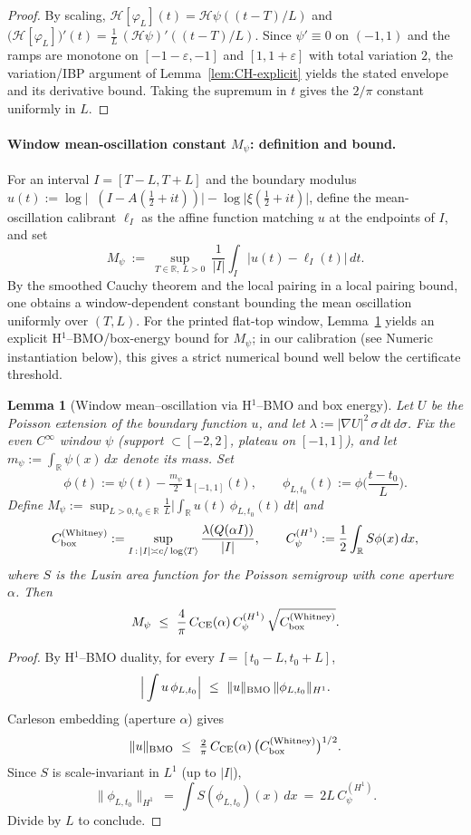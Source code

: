 \documentclass[11pt]{article}
\newtheorem{lemma}[theorem]{Lemma}
\theoremstyle{definition}
\theoremstyle{remark}
\theoremstyle{definition}
\newcommand{\R}{\mathbb{R}}
\DeclareMathOperator{\dettwo}{det_2}
\begin{document}
\begin{proof}
By scaling, \(\mathcal H[\varphi_L](t)=\mathcal H\psi((t-T)/L)\) and \(\big(\mathcal H[\varphi_L]\big)'(t)=\tfrac{1}{L}\,(\mathcal H\psi)'((t-T)/L)\). Since \(\psi'\equiv 0\) on \((-1,1)\) and the ramps are monotone on \([-1-\varepsilon,-1]\) and \([1,1+\varepsilon]\) with total variation \(2\), the variation/IBP argument of Lemma~\ref{lem:CH-explicit} yields the stated envelope and its derivative bound. Taking the supremum in \(t\) gives the \(2/\pi\) constant uniformly in \(L\).
\end{proof}
\paragraph{Window mean-oscillation constant \(M_\psi\): definition and bound.}
For an interval \(I=[T{-}L,T{+}L]\) and the boundary modulus \(u(t):=\log\big|\dettwo(I{-}A(\tfrac12{+}it))\big|{-}\log\big|\xi(\tfrac12{+}it)\big|\), define the mean-oscillation calibrant \(\ell_I\) as the affine function matching \(u\) at the endpoints of \(I\), and set
\[
  M_\psi\ :=\ \sup_{T\in\R,\ L>0}\ \frac{1}{|I|}\int_I \big|u(t)-\ell_I(t)\big|\,dt.
\]
By the smoothed Cauchy theorem and the local pairing in a local pairing bound, one obtains a window-dependent constant bounding the mean oscillation uniformly over $(T,L)$. For the printed flat-top window, Lemma~\ref{lem:Mpsi-correct} yields an explicit H$^1$--BMO/box-energy bound for $M_\psi$; in our calibration (see Numeric instantiation below), this gives a strict numerical bound well below the certificate threshold.
\begin{lemma}[Window mean--oscillation via H$^1$--BMO and box energy]\label{lem:Mpsi-correct}
Let $U$ be the Poisson extension of the boundary function $u$, and let $\lambda := |\nabla U|^2\,\sigma\,dt\,d\sigma$.
Fix the even $C^\infty$ window $\psi$ (support $\subset[-2,2]$, plateau on $[-1,1]$), and let $m_\psi:=\int_{\R}\psi(x)\,dx$ denote its mass. Set
\[
\phi(t):=\psi(t)-\tfrac{m_\psi}{2}\,\mathbf 1_{[-1,1]}(t),\qquad 
\phi_{L,t_0}(t):=\phi\!\Big(\frac{t-t_0}{L}\Big).
\]
Define $M_\psi:=\sup_{L>0,t_0\in\R}\frac1L\big|\int_\R u(t)\,\phi_{L,t_0}(t)\,dt\big|$ and
\[
 C_{\rm box}^{(\mathrm{Whitney})}:=\sup_{I\,:\,|I|\asymp c/\log\langle T\rangle}\frac{\lambda(Q(\alpha I))}{|I|},\qquad
C_\psi^{(H^1)}:=\frac12\int_{\R} S\phi(x)\,dx,
\]
where $S$ is the Lusin area function for the Poisson semigroup with cone aperture $\alpha$.
Then
\[
M_\psi\ \le\ \frac{4}{\pi}\,C_{\mathrm{CE}}(\alpha)\,C_\psi^{(H^1)}\,\sqrt{C_{\rm box}^{(\mathrm{Whitney})}}.
\]
\end{lemma}
\begin{proof}
By H$^1$--BMO duality, for every $I=[t_0-L,t_0+L]$,
\[ \Big|\int u\,\phi_{L,t_0}\Big|\ \le\ \|u\|_{\rm BMO}\,\|\phi_{L,t_0}\|_{H^1}. \]
Carleson embedding (aperture $\alpha$) gives
\[ \|u\|_{\rm BMO}\ \le\ \tfrac{2}{\pi}\,C_{\mathrm{CE}}(\alpha)\,\big(C_{\rm box}^{(\mathrm{Whitney})}\big)^{1/2}. \]
Since $S$ is scale-invariant in $L^1$ (up to $|I|$),
\[ \|\phi_{L,t_0}\|_{H^1}\ =\ \int S(\phi_{L,t_0})(x)\,dx\ =\ 2L\,C_\psi^{(H^1)}. \]
Divide by $L$ to conclude.
\end{proof}
\end{document}
